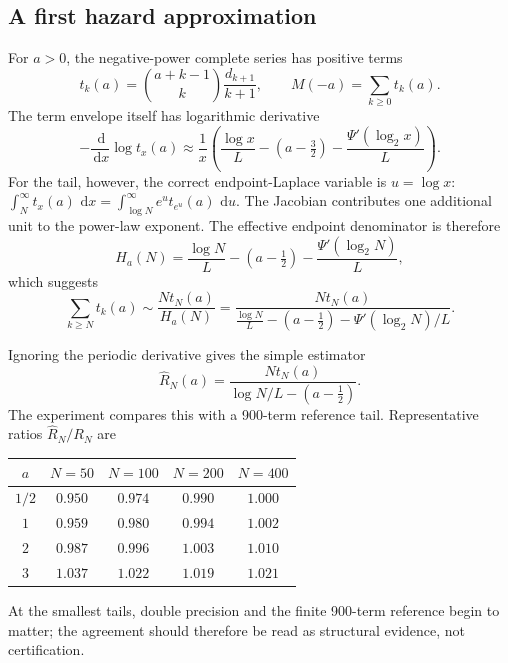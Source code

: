 \documentclass[11pt,oneside]{article}
\numberwithin{equation}{section}
\theoremstyle{definition}
\theoremstyle{remark}
\newcommand{\dd}{\,\mathrm d}
\begin{document}
\subsection{A first hazard approximation}

For $a>0$, the negative-power complete series has positive terms
\begin{equation}
 t_k(a)=\binom{a+k-1}{k}\frac{d_{k+1}}{k+1},
 \qquad M(-a)=\sum_{k\ge0}t_k(a).                             \label{eq:negative-terms}
\end{equation}
The term envelope itself has logarithmic derivative
\begin{equation}
 -\frac{\dd}{\dd x}\log t_x(a)
 \approx\frac1x\left(\frac{\log x}{L}-(a-\tfrac32)
 -\frac{\Psi'(\log_2x)}{L}\right).                          \label{eq:term-hazard}
\end{equation}
For the tail, however, the correct endpoint-Laplace variable is $u=\log x$:
\(
\int_N^\infty t_x(a)\,\dd x
 =\int_{\log N}^\infty e^u t_{e^u}(a)\,\dd u.
\)
The Jacobian contributes one additional unit to the power-law exponent.  The effective
endpoint denominator is therefore
\begin{equation}
 H_a(N)=\frac{\log N}{L}-(a-\tfrac12)
 -\frac{\Psi'(\log_2N)}{L},                                  \label{eq:hazard}
\end{equation}
which suggests
\begin{equation}
 \sum_{k\ge N}t_k(a)
 \sim\frac{Nt_N(a)}{H_a(N)}
 =\frac{Nt_N(a)}{\frac{\log N}{L}-(a-\tfrac12)
 -\Psi'(\log_2N)/L}.                                        \label{eq:tail-conjectural}
\end{equation}

Ignoring the periodic derivative gives the simple estimator
\begin{equation}
 \widehat R_N(a)=
 \frac{Nt_N(a)}{\log N/L-(a-\tfrac12)}.                      \label{eq:tail-simple}
\end{equation}
The experiment compares this with a 900-term reference tail.  Representative ratios
$\widehat R_N/R_N$ are
\begin{center}
\begin{tabular}{@{}ccccc@{}}
\toprule
$a$ & $N=50$ & $N=100$ & $N=200$ & $N=400$\\
\midrule
$1/2$ & $0.950$ & $0.974$ & $0.990$ & $1.000$\\
$1$   & $0.959$ & $0.980$ & $0.994$ & $1.002$\\
$2$   & $0.987$ & $0.996$ & $1.003$ & $1.010$\\
$3$   & $1.037$ & $1.022$ & $1.019$ & $1.021$\\
\bottomrule
\end{tabular}
\end{center}
At the smallest tails, double precision and the finite 900-term reference begin to matter;
the agreement should therefore be read as structural evidence, not certification.
\end{document}
